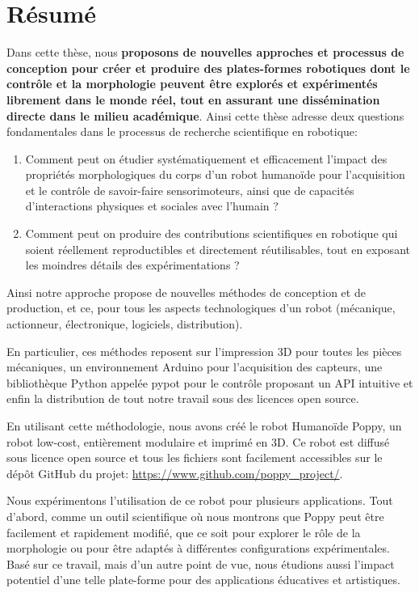 

\chapter*{Résumé}


Dans cette thèse, nous \textbf{proposons de nouvelles approches et processus de conception pour créer et produire des plates-formes robotiques dont le contrôle et la morphologie peuvent être explorés et expérimentés librement dans le monde réel, tout en assurant une dissémination directe dans le milieu académique}.
Ainsi cette thèse adresse deux questions fondamentales dans le processus de recherche scientifique en robotique:

\begin{enumerate}
  \item Comment peut on étudier systématiquement et efficacement l’impact des propriétés morphologiques du corps d’un robot humanoïde pour l’acquisition et le contrôle de savoir-faire sensorimoteurs, ainsi que de capacités d’interactions physiques et sociales avec l’humain ?
  \item Comment peut on produire des contributions scientifiques en robotique qui soient réellement reproductibles et directement réutilisables, tout en exposant les moindres détails des expérimentations ?
\end{enumerate}

Ainsi notre approche propose de nouvelles méthodes de conception et de production, et ce, pour tous les aspects technologiques d'un robot (mécanique, actionneur, électronique, logiciels, distribution).

En particulier, ces méthodes reposent sur l'impression 3D pour toutes les pièces mécaniques, un environnement Arduino pour l'acquisition des capteurs, une bibliothèque Python appelée pypot pour le contrôle proposant un API intuitive et enfin la distribution de tout notre travail sous des licences open source. 

En utilisant cette méthodologie, nous avons créé le robot Humanoïde Poppy, un robot low-cost, entièrement modulaire et imprimé en 3D. Ce robot est diffusé sous licence open source et tous les fichiers sont facilement accessibles sur le dépôt GitHub du projet: \url{https://www.github.com/poppy_project/}.

Nous expérimentons l'utilisation de ce robot pour plusieurs applications. Tout d'abord, comme un outil scientifique où nous montrons que Poppy peut être facilement et rapidement modifié, que ce soit pour explorer le rôle de la morphologie ou pour être adaptés à différentes configurations expérimentales. Basé sur ce travail, mais d'un autre point de vue, nous étudions aussi l'impact potentiel d'une telle plate-forme pour des applications éducatives et artistiques.

